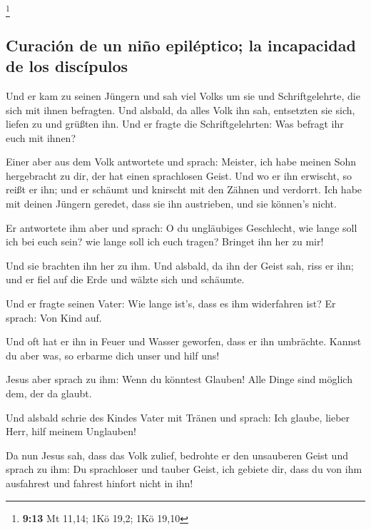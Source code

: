 \footnote{\textbf{9:13} Mt 11,14; 1Kö 19,2; 1Kö 19,10}

\hypertarget{curaciuxf3n-de-un-niuxf1o-epiluxe9ptico-la-incapacidad-de-los-discuxedpulos}{%
\subsection{Curación de un niño epiléptico; la incapacidad de los
discípulos}\label{curaciuxf3n-de-un-niuxf1o-epiluxe9ptico-la-incapacidad-de-los-discuxedpulos}}

 Und er kam zu seinen Jüngern und sah viel Volks um sie
und Schriftgelehrte, die sich mit ihnen befragten.  Und
alsbald, da alles Volk ihn sah, entsetzten sie sich, liefen zu und
grüßten ihn.  Und er fragte die Schriftgelehrten: Was
befragt ihr euch mit ihnen?

 Einer aber aus dem Volk antwortete und sprach: Meister,
ich habe meinen Sohn hergebracht zu dir, der hat einen sprachlosen
Geist.  Und wo er ihn erwischt, so reißt er ihn; und er
schäumt und knirscht mit den Zähnen und verdorrt. Ich habe mit deinen
Jüngern geredet, dass sie ihn austrieben, und sie können's nicht.

 Er antwortete ihm aber und sprach: O du ungläubiges
Geschlecht, wie lange soll ich bei euch sein? wie lange soll ich euch
tragen? Bringet ihn her zu mir!

 Und sie brachten ihn her zu ihm. Und alsbald, da ihn der
Geist sah, riss er ihn; und er fiel auf die Erde und wälzte sich und
schäumte.

 Und er fragte seinen Vater: Wie lange ist's, dass es ihm
widerfahren ist? Er sprach: Von Kind auf.

 Und oft hat er ihn in Feuer und Wasser geworfen, dass er
ihn umbrächte. Kannst du aber was, so erbarme dich unser und hilf uns!

 Jesus aber sprach zu ihm: Wenn du könntest Glauben! Alle
Dinge sind möglich dem, der da glaubt.

 Und alsbald schrie des Kindes Vater mit Tränen und
sprach: Ich glaube, lieber Herr, hilf meinem Unglauben!

 Da nun Jesus sah, dass das Volk zulief, bedrohte er den
unsauberen Geist und sprach zu ihm: Du sprachloser und tauber Geist, ich
gebiete dir, dass du von ihm ausfahrest und fahrest hinfort nicht in
ihn!


